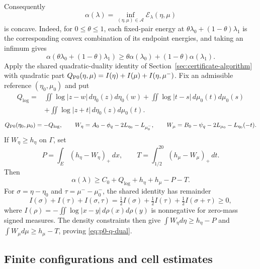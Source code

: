 Consequently
\begin{equation}\label{eq:p0-q-alpha}
 \alpha(\lambda)=\inf_{(\eta,\mu)\in\mathcal A}
                    \mathcal E_\lambda(\eta,\mu)
\end{equation}
is concave.  Indeed, for $0\le\theta\le1$, each fixed-pair energy at
$\theta\lambda_0+(1-\theta)\lambda_1$ is the corresponding convex
combination of its endpoint energies, and taking an infimum gives
\[
 \alpha(\theta\lambda_0+(1-\theta)\lambda_1)
       \ge\theta\alpha(\lambda_0)+(1-\theta)\alpha(\lambda_1).
\]
Apply the shared quadratic-duality identity of
Section~\ref{sec:certificate-algorithm} with quadratic part
$Q_{\rm P0}(\eta,\mu)=I(\eta)+I(\mu)+I(\eta,\mu^-)$.  Fix an admissible
reference $(\eta_0,\mu_0)$ and put
\begin{align*}
 Q_{\log}={}&\iint\log|z-w|\,d\eta_0(z)d\eta_0(w)
 +\iint\log|t-s|\,d\mu_0(t)d\mu_0(s)\\
 &+\iint\log|z+t|\,d\eta_0(z)d\mu_0(t).
\end{align*}
\[
Q_{\rm P0}(\eta_0,\mu_0)=-Q_{\log},\qquad
W_\eta=A_0-\phi_q-2L_{\eta_0}-L_{\mu_0^-},\qquad
 W_\mu=B_0-\psi_q-2L_{\mu_0}-L_{\eta_0}(-t).
\]
If $W_\eta\ge h_\eta$ on $\Gamma$, set
\[
 P=\int_E(h_\eta-W_\eta)_+\,dx,\qquad
 T=\int_{1/2}^{20}(h_\mu-W_\mu)_+\,dt.
\]
Then
\begin{equation}\label{eq:p0-q-dual}
 \alpha(\lambda)\ge C_0+Q_{\log}+h_\eta+h_\mu-P-T.
\end{equation}
For $\sigma=\eta-\eta_0$ and $\tau=\mu^- -\mu_0^-$, the shared identity
has remainder
\[
 I(\sigma)+I(\tau)+I(\sigma,\tau)
 =\tfrac12 I(\sigma)+\tfrac12 I(\tau)
                         +\tfrac12 I(\sigma+\tau)\ge0,
\]
where $I(\rho)=-\iint\log|x-y|\,d\rho(x)d\rho(y)$ is nonnegative for
zero-mass signed measures.  The density constraints then give
$\int W_\eta d\eta\ge h_\eta-P$ and
$\int W_\mu d\mu\ge h_\mu-T$, proving \eqref{eq:p0-q-dual}.

\subsection{Finite configurations and cell estimates}


